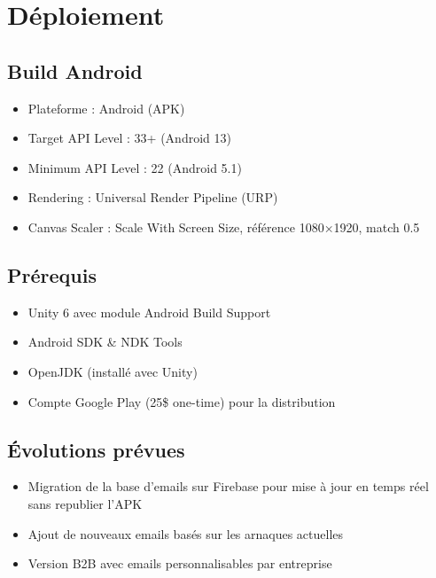 \documentclass[12pt,a4paper]{article}
\begin{document}
\section{Déploiement}

\subsection{Build Android}
\begin{itemize}
    \item Plateforme : Android (APK)
    \item Target API Level : 33+ (Android 13)
    \item Minimum API Level : 22 (Android 5.1)
    \item Rendering : Universal Render Pipeline (URP)
    \item Canvas Scaler : Scale With Screen Size, référence 1080×1920, match 0.5
\end{itemize}

\subsection{Prérequis}
\begin{itemize}
    \item Unity 6 avec module Android Build Support
    \item Android SDK \& NDK Tools
    \item OpenJDK (installé avec Unity)
    \item Compte Google Play (25\$ one-time) pour la distribution
\end{itemize}

\subsection{Évolutions prévues}
\begin{itemize}
    \item Migration de la base d'emails sur Firebase pour mise à jour en temps réel sans republier l'APK
    \item Ajout de nouveaux emails basés sur les arnaques actuelles
    \item Version B2B avec emails personnalisables par entreprise
\end{itemize}

\end{document}
